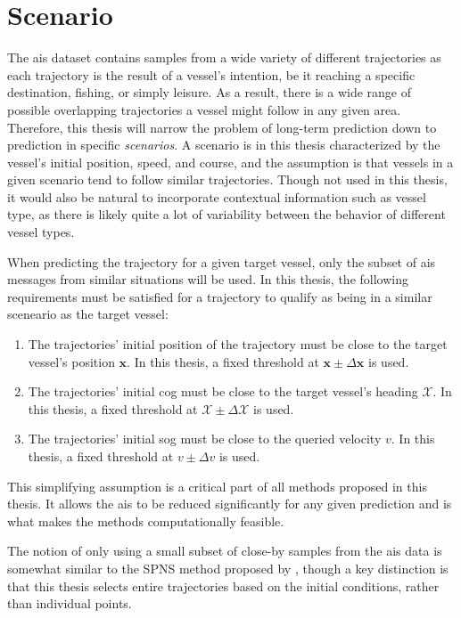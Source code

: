 \section{Scenario}
The \acrshort{ais} dataset contains samples from a wide variety of different trajectories as each trajectory is the result of a vessel's intention, be it reaching a specific destination, fishing, or simply leisure. As a result, there is a wide range of possible overlapping trajectories a vessel might follow in any given area. Therefore, this thesis will narrow the problem of long-term prediction down to prediction in specific \textit{scenarios}. A scenario is in this thesis characterized by the vessel's initial position, speed, and course, and the assumption is that vessels in a given scenario tend to follow similar trajectories. Though not used in this thesis, it would also be natural to incorporate contextual information such as vessel type, as there is likely quite a lot of variability between the behavior of different vessel types. 

When predicting the trajectory for a given target vessel, only the subset of \acrshort{ais} messages from similar situations will be used. In this thesis, the following requirements must be satisfied for a trajectory to qualify as being in a similar sceneario as the target vessel:
\begin{enumerate}
    \item The trajectories' initial position of the trajectory must be close to the target vessel's position $\boldsymbol{x}$. In this thesis, a fixed threshold at $\boldsymbol{x} \pm \Delta \boldsymbol{x}$ is used.
    \item The trajectories' initial \acrshort{cog} must be close to the target vessel's heading $\mathcal{X}$. In this thesis, a fixed threshold at $\mathcal{X} \pm \Delta \mathcal{X}$ is used.
    \item The trajectories' initial \acrshort{sog} must be close to the queried velocity $v$. In this thesis, a fixed threshold at $v \pm \Delta v$ is used.
\end{enumerate}

This simplifying assumption is a critical part of all methods proposed in this thesis. It allows the \acrshort{ais} to be reduced significantly for any given prediction and is what makes the methods computationally feasible. 

The notion of only using a small subset of close-by samples from the \acrshort{ais} data is somewhat similar to the SPNS method proposed by \cite{Hexeberg2017AISbasedVT}, though a key distinction is that this thesis selects entire trajectories based on the initial conditions, rather than individual points. 

